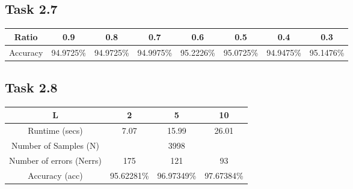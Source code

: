\documentclass{article}
\begin{document}
\subsection*{Task 2.7}
\begin{center}
\begin{tabular}{ |c|c|c|c|c|c|c|c| } 
    \hline
    Ratio & 0.9 & 0.8 & 0.7 & 0.6 & 0.5 & 0.4 & 0.3 \\ 
    \hline
    Accuracy & 94.9725\% & 94.9725\% & 94.9975\% & 95.2226\% & 95.0725\% & 94.9475\% & 95.1476\% \\
    \hline
\end{tabular}
\end{center}

\subsection*{Task 2.8}

\begin{center}
\begin{tabular}{ |c|c|c|c| } 
 \hline
 L & 2 & 5 & 10 \\ 
 \hline
 Runtime (secs) & 7.07 & 15.99 & 26.01 \\
 \hline
 Number of Samples (N) & \multicolumn{3}{|c|}{3998} \\
 \hline
 Number of errors (Nerrs) & 175 & 121 & 93 \\
 \hline
 Accuracy (acc) & 95.62281\% & 96.97349\% & 97.67384\% \\
 \hline
\end{tabular}
\end{center}


\end{document}
